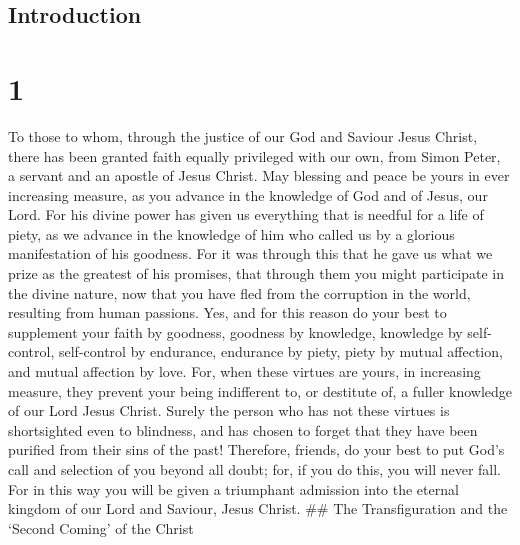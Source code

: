 \hypertarget{introduction}{%
\subsection{Introduction}\label{introduction}}

\hypertarget{section}{%
\section{1}\label{section}}

 To those to whom, through the justice of our God and
Saviour Jesus Christ, there has been granted faith equally privileged
with our own, from Simon Peter, a servant and an apostle of Jesus
Christ.  May blessing and peace be yours in ever increasing
measure, as you advance in the knowledge of God and of Jesus, our Lord.
 For his divine power has given us everything that is
needful for a life of piety, as we advance in the knowledge of him who
called us by a glorious manifestation of his goodness.  For
it was through this that he gave us what we prize as the greatest of his
promises, that through them you might participate in the divine nature,
now that you have fled from the corruption in the world, resulting from
human passions.  Yes, and for this reason do your best to
supplement your faith by goodness, goodness by knowledge, 
knowledge by self-control, self-control by endurance, endurance by
piety,  piety by mutual affection, and mutual affection by
love.  For, when these virtues are yours, in increasing
measure, they prevent your being indifferent to, or destitute of, a
fuller knowledge of our Lord Jesus Christ.  Surely the
person who has not these virtues is shortsighted even to blindness, and
has chosen to forget that they have been purified from their sins of the
past!  Therefore, friends, do your best to put God's call
and selection of you beyond all doubt; for, if you do this, you will
never fall.  For in this way you will be given a triumphant
admission into the eternal kingdom of our Lord and Saviour, Jesus
Christ. \#\# The Transfiguration and the `Second Coming' of the Christ

